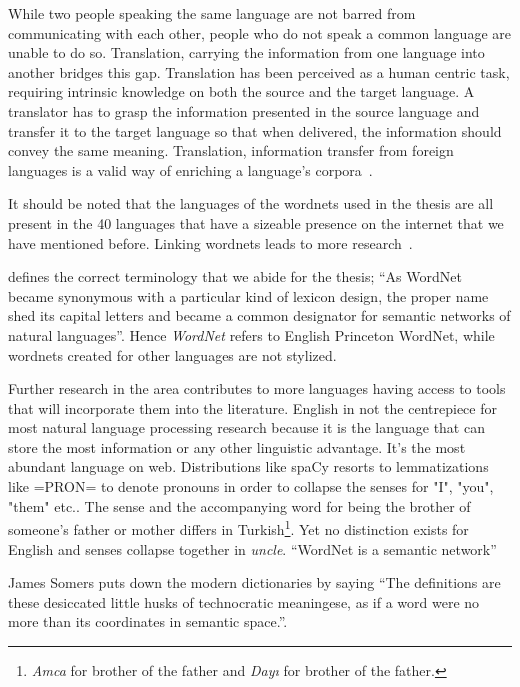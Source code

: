 While two people speaking the same language are not barred from communicating with each other, people who do not speak a common language are unable to do so.
Translation, carrying the information from one language into another bridges this gap.
Translation has been perceived as a human centric task, requiring intrinsic knowledge on both the source and the target language.
A translator has to grasp the information presented in the source language and transfer it to the target language so that when delivered, the information should convey the same meaning.
Translation, information transfer from foreign languages is a valid way of enriching a language's corpora~\cite{ibrahim_usta_turkce_2006}.

It should be noted that the languages of the wordnets used in the thesis are all present in the 40 languages that have a sizeable presence on the internet that we have mentioned before.
Linking wordnets leads to more research~\cite{sagot_building_2008}.

\textcite{fellbaum_semantic_1998} defines the correct terminology that we abide for the thesis; \enquote{As WordNet became synonymous with a particular kind of lexicon design, the proper name shed its capital letters and became a common designator for semantic networks of natural languages}.
Hence \emph{WordNet} refers to English Princeton WordNet, while wordnets created for other languages are not stylized.

Further research in the area contributes to more languages having access to tools that will incorporate them into the literature.
English in not the centrepiece for most natural language processing research because it is the language that can store the most information or any other linguistic advantage.
It's the most abundant language on web.
Distributions like spaCy resorts to lemmatizations like =PRON= to denote pronouns in order to collapse the senses for "I", "you", "them" etc.\@.
The sense and the accompanying word for being the brother of someone's father or mother differs in Turkish\footnote{\emph{Amca} for brother of the father and \emph{Dayı} for brother of the father.}.
Yet no distinction exists for English and senses collapse together in \emph{uncle}.
\enquote{WordNet is a semantic network}\cite{fellbaum_wordnet_1998-1}

James Somers puts down the modern dictionaries by saying \enquote{The definitions are these desiccated little husks of technocratic meaningese, as if a word were no more than its coordinates in semantic space.}\cite{somers_youre_2014}.

